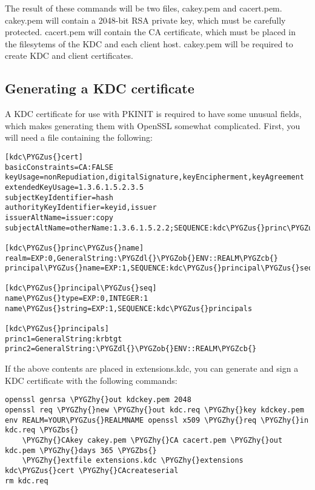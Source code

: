 \documentclass[letterpaper,10pt,english]{sphinxmanual}
\def\PYGZbs{\char`\\}
\def\PYGZus{\char`\_}
\def\PYGZob{\char`\{}
\def\PYGZcb{\char`\}}
\def\PYGZdl{\char`\$}
\def\PYGZhy{\char`\-}
\begin{document}
The result of these commands will be two files, cakey.pem and
cacert.pem.  cakey.pem will contain a 2048-bit RSA private key, which
must be carefully protected.  cacert.pem will contain the CA
certificate, which must be placed in the filesytems of the KDC and
each client host.  cakey.pem will be required to create KDC and client
certificates.


\subsection{Generating a KDC certificate}
\label{admin/pkinit:generating-a-kdc-certificate}
A KDC certificate for use with PKINIT is required to have some unusual
fields, which makes generating them with OpenSSL somewhat complicated.
First, you will need a file containing the following:

\begin{Verbatim}[commandchars=\\\{\}]
[kdc\PYGZus{}cert]
basicConstraints=CA:FALSE
keyUsage=nonRepudiation,digitalSignature,keyEncipherment,keyAgreement
extendedKeyUsage=1.3.6.1.5.2.3.5
subjectKeyIdentifier=hash
authorityKeyIdentifier=keyid,issuer
issuerAltName=issuer:copy
subjectAltName=otherName:1.3.6.1.5.2.2;SEQUENCE:kdc\PYGZus{}princ\PYGZus{}name

[kdc\PYGZus{}princ\PYGZus{}name]
realm=EXP:0,GeneralString:\PYGZdl{}\PYGZob{}ENV::REALM\PYGZcb{}
principal\PYGZus{}name=EXP:1,SEQUENCE:kdc\PYGZus{}principal\PYGZus{}seq

[kdc\PYGZus{}principal\PYGZus{}seq]
name\PYGZus{}type=EXP:0,INTEGER:1
name\PYGZus{}string=EXP:1,SEQUENCE:kdc\PYGZus{}principals

[kdc\PYGZus{}principals]
princ1=GeneralString:krbtgt
princ2=GeneralString:\PYGZdl{}\PYGZob{}ENV::REALM\PYGZcb{}
\end{Verbatim}

If the above contents are placed in extensions.kdc, you can generate
and sign a KDC certificate with the following commands:

\begin{Verbatim}[commandchars=\\\{\}]
openssl genrsa \PYGZhy{}out kdckey.pem 2048
openssl req \PYGZhy{}new \PYGZhy{}out kdc.req \PYGZhy{}key kdckey.pem
env REALM=YOUR\PYGZus{}REALMNAME openssl x509 \PYGZhy{}req \PYGZhy{}in kdc.req \PYGZbs{}
    \PYGZhy{}CAkey cakey.pem \PYGZhy{}CA cacert.pem \PYGZhy{}out kdc.pem \PYGZhy{}days 365 \PYGZbs{}
    \PYGZhy{}extfile extensions.kdc \PYGZhy{}extensions kdc\PYGZus{}cert \PYGZhy{}CAcreateserial
rm kdc.req
\end{Verbatim}
\end{document}
